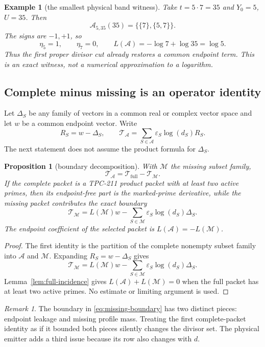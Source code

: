 \documentclass[11pt]{article}
\newtheorem{proposition}[theorem]{Proposition}
\newtheorem{example}[theorem]{Example}
\theoremstyle{definition}
\theoremstyle{remark}
\newtheorem{remark}[theorem]{Remark}
\newcommand{\Aset}{\mathcal A}
\newcommand{\MM}{\mathcal M}
\begin{document}
\begin{example}[the smallest physical band witness]
\label{ex:35-band}
Take $t=5\cdot7=35$ and $Y_0=5$, $U=35$.  Then
\[
 \Aset_{5,35}(35)=\{\{7\},\{5,7\}\}.
\]
The signs are $-1,+1$, so
\[
 \eta_5=1,\qquad \eta_7=0,
 \qquad L(\Aset)= -\log7+\log35=\log5.
 \label{eq:35-leak}
\]
Thus the first proper divisor cut already restores a common endpoint term.
This is an exact witness, not a numerical approximation to a logarithm.
\end{example}

\subsection{Complete minus missing is an operator identity}

Let $\Delta_S$ be any family of vectors in a common real or complex vector
space and let $w$ be a common endpoint vector.  Write
\[
 R_S=w-\Delta_S,
 \qquad
 \mathcal T_\Aset=\sum_{S\in\Aset}\varepsilon_S\log(d_S)R_S.
 \label{eq:packet-functional}
\]
The next statement does not assume the product formula for $\Delta_S$.

\begin{proposition}[boundary decomposition]
\label{prop:boundary-decomp}
With $\MM$ the missing subset family,
\[
 \mathcal T_\Aset=\mathcal T_{\mathrm{full}}-\mathcal T_\MM.
 \label{eq:boundary-decomp}
\]
If the complete packet is a TPC-211 product packet with at least two active
primes, then its endpoint-free part is the marked-prime derivative, while the
missing packet contributes the exact boundary
\[
 \mathcal T_\MM
 =L(\MM)w-\sum_{S\in\MM}\varepsilon_S\log(d_S)\Delta_S.
 \label{eq:missing-boundary}
\]
The endpoint coefficient of the selected packet is $L(\Aset)=-L(\MM)$.
\end{proposition}

\begin{proof}
The first identity is the partition of the complete nonempty subset family
into $\Aset$ and $\MM$.  Expanding $R_S=w-\Delta_S$ gives
\[
 \mathcal T_\MM=L(\MM)w-
 \sum_{S\in\MM}\varepsilon_S\log(d_S)\Delta_S.
\]
Lemma~\ref{lem:full-incidence} gives $L(\Aset)+L(\MM)=0$ when the full packet
has at least two active primes.  No estimate or limiting argument is used.
\end{proof}

\begin{remark}
The boundary in \eqref{eq:missing-boundary} has two distinct pieces: endpoint
leakage and missing profile mass.  Treating the first complete-packet identity
as if it bounded both pieces silently changes the divisor set.  The physical
emitter adds a third issue because its row also changes with $d$.
\end{remark}
\end{document}
